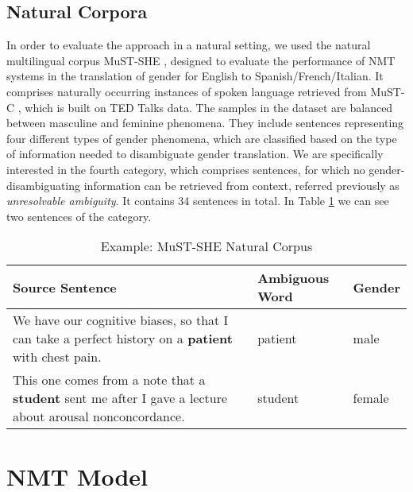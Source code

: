 \subsection{Natural Corpora}
\label{sec:Setup:Natural_Corpora}

In order to evaluate the approach in a natural setting, we used the natural multilingual corpus MuST-SHE \parencite{MuST-SHE}, designed to evaluate the performance of NMT systems in the translation of gender for English to Spanish/French/Italian. It comprises naturally occurring instances of spoken language retrieved from MuST-C \parencite{MuST-C}, which is built on TED Talks data. The samples in the dataset are balanced between masculine and feminine phenomena. They include sentences representing four different types of gender phenomena, which are classified based
on the type of information needed to disambiguate gender translation. We are specifically interested in the fourth category, which comprises sentences, for which no gender-disambiguating information can be retrieved from context, referred previously as \textit{unresolvable ambiguity}. It contains 34 sentences in total. In Table \ref{tab:mustshe} we can see two sentences of the category. 

\begin{table}[!htb]
    \begin{tabularx}{\linewidth}{|X|l|l|}
        \hline
        \textbf{Source Sentence} & \textbf{Ambiguous Word} & \textbf{Gender} \\ \hline
        We have our cognitive biases, so that I can take a perfect history on a \textbf{patient} with chest pain. & patient & male \\ \hline
        This one comes from a note that a \textbf{student} sent me after I gave a lecture about arousal nonconcordance. & student & female \\ \hline
    \end{tabularx}
    \caption{Example: MuST-SHE Natural Corpus}
    \label{tab:mustshe}
\end{table}

\section{NMT Model}
\label{sec:Setup:Models}


